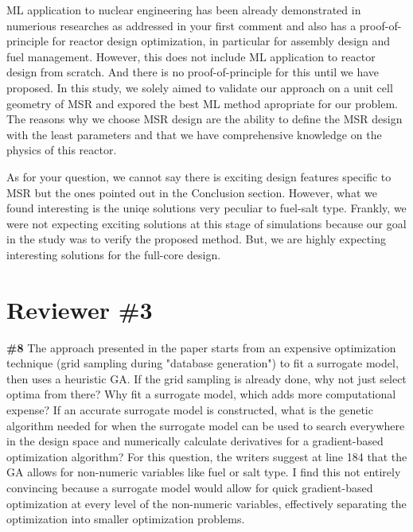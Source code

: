 \documentclass{ar2rc}
\begin{document}
    ML application to nuclear engineering has been already demonstrated in numerious researches as addressed in your first comment and also has a proof-of-principle for reactor design optimization, in particular for assembly design and fuel management. However, this does not include ML application to reactor design from scratch. And there is no proof-of-principle for this until we have proposed. In this study, we solely aimed to validate our approach on a unit cell geometry of MSR and expored the best ML method apropriate for our problem. The reasons why we choose MSR design are the ability to define the MSR design with the least parameters and that we have comprehensive knowledge on the physics of this reactor.

    As for your question, we cannot say there is exciting design features specific to MSR but the ones pointed out in the Conclusion section. However, what we found interesting is the uniqe solutions very peculiar to fuel-salt type. Frankly, we were not expecting exciting solutions at this stage of simulations because our goal in the study was to verify the proposed method. But, we are highly expecting interesting solutions for the full-core design.


\section*{Reviewer \#3}


    \Comment \textbf{\#8} The approach presented in the paper starts from an expensive
    optimization technique (grid sampling during "database generation") to fit
    a surrogate model, then uses a heuristic GA. If the grid sampling is
    already done, why not just select optima from there? Why fit a surrogate
    model, which adds more computational expense? If an accurate surrogate
    model is constructed, what is the genetic algorithm needed for when the
    surrogate model can be used to search everywhere in the design space and
    numerically calculate derivatives for a gradient-based optimization
    algorithm? For this question, the writers suggest at line 184 that the GA
    allows for non-numeric variables like fuel or salt type. I find this not
    entirely convincing because a surrogate model would allow for quick
    gradient-based optimization at every level of the non-numeric variables,
    effectively separating the optimization into smaller optimization problems.
\end{document}
